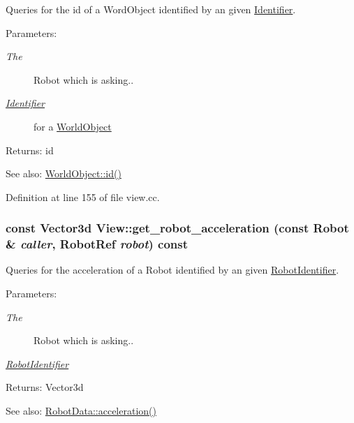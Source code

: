Queries for the id of a WordObject identified by an given \hyperlink{class_identifier}{Identifier}. \begin{Desc}
\item[Parameters:]
\begin{description}
\item[{\em The}]Robot which is asking.. \item[{\em \hyperlink{class_identifier}{Identifier}}]for a \hyperlink{class_world_object}{WorldObject} \end{description}
\end{Desc}
\begin{Desc}
\item[Returns:]id \end{Desc}
\begin{Desc}
\item[See also:]\hyperlink{class_world_object_86cb6d16f21d52ebe8f9dc48e9e762f3}{WorldObject::id()} \end{Desc}


Definition at line 155 of file view.cc.\hypertarget{class_view_e1900efc7a61a79882222b9efbcc3708}{
\subsubsection[get\_\-robot\_\-acceleration]{\setlength{\rightskip}{0pt plus 5cm}const Vector3d View::get\_\-robot\_\-acceleration (const Robot \& {\em caller}, \/  RobotRef {\em robot}) const}}
\label{class_view_e1900efc7a61a79882222b9efbcc3708}


Queries for the acceleration of a Robot identified by an given \hyperlink{class_robot_identifier}{RobotIdentifier}. \begin{Desc}
\item[Parameters:]
\begin{description}
\item[{\em The}]Robot which is asking.. \item[{\em \hyperlink{class_robot_identifier}{RobotIdentifier}}]\end{description}
\end{Desc}
\begin{Desc}
\item[Returns:]Vector3d \end{Desc}
\begin{Desc}
\item[See also:]\hyperlink{class_robot_data_a65f6448e4ec4061b6300283f3cdd8da}{RobotData::acceleration()} \end{Desc}


